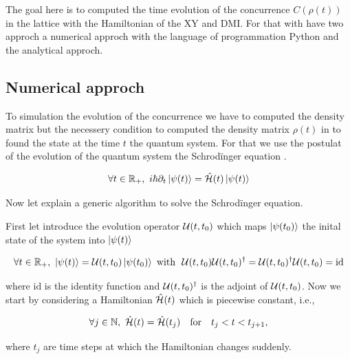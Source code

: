 The goal here is to computed the time evolution of the concurrence $C(\rho (t))$ in the lattice 
with the Hamiltonian of the XY and DMI.
For that with have two approch a numerical approch with the language of programmation Python and the 
analytical approch.

\subsection{Numerical approch}

To simulation the evolution of the concurrence  we have to computed the 
density matrix but the necessery 
condition to computed the density matrix $\rho(t)$ in to found 
the state at the time $t$ the quantum system. For that 
we use the postulat of the evolution of the quantum system the Schrodïnger equation \cite{cohen-tannoudji_quantum_2019}. 

\begin{equation}\label{eq: Schrodïnger eq}
    \forall t \in \mathbb{R}_+, \ i \hbar \partial_t \ket{\psi(t)} = \hat{\mathcal{H}}(t) \ket{\psi (t)} 
\end{equation}

Now let explain a generic algorithm to solve the Schrodïnger equation.

First let introduce the evolution operator $ \mathcal{U}(t,t_0)$ which maps $ \ket{\psi(t_0)}$ the inital state of 
the system into $\ket{\psi(t)} $  

\begin{equation}\label{def : evolution operator}
   \forall t \in \mathbb{R}_+, \ \ket{\psi(t)} = \mathcal{U}(t,t_0)  \ket{\psi(t_0)} 
   \text{ with  } \ \mathcal{U}(t,t_0) \mathcal{U}(t,t_0)^\dagger = \mathcal{U}(t,t_0)^\dagger \mathcal{U}(t,t_0) = \text{id}  
\end{equation}

where $\text{id}$ is the identity function and $\mathcal{U}(t,t_0)^\dagger$ is the adjoint of $\mathcal{U}(t,t_0)$.
Now we start by considering a Hamiltonian \( \hat{\mathcal{H}}(t) \) which is piecewise constant, i.e.,


\begin{equation}\label{prop: hypothese Hamiltionan}
    \forall j \in \mathbb{N}, \  \hat{\mathcal{H}}(t) = \hat{\mathcal{H}}(t_j) \quad \text{for} \quad t_j < t < t_{j+1},     
\end{equation}

where \( t_j \) are time steps at which the Hamiltonian changes suddenly.

